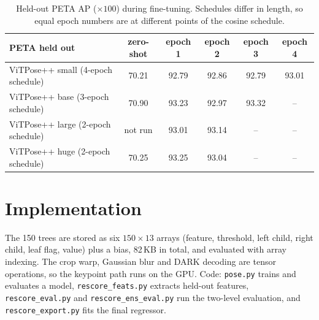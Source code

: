 \documentclass[10pt,twocolumn,letterpaper]{article}
\begin{document}
\begin{table}[h]
\centering\small
\begin{tabular}{@{}lccccc@{}}
\toprule
PETA held out & zero-shot & epoch 1 & epoch 2 & epoch 3 & epoch 4 \\
\midrule
ViTPose++ small (4-epoch schedule) & 70.21 & 92.79 & 92.86 & 92.79 & 93.01 \\
ViTPose++ base (3-epoch schedule) & 70.90 & 93.23 & 92.97 & 93.32 & -- \\
ViTPose++ large (2-epoch schedule) & not run & 93.01 & 93.14 & -- & -- \\
ViTPose++ huge (2-epoch schedule) & 70.25 & 93.25 & 93.04 & -- & -- \\
\bottomrule
\end{tabular}
\caption{Held-out PETA AP ($\times100$) during fine-tuning. Schedules differ in length, so equal epoch numbers are at different points of the cosine schedule.}
\end{table}

\section{Implementation}

The 150 trees are stored as six $150\times13$ arrays (feature, threshold, left child, right child, leaf flag, value) plus a bias, 82\,KB in total, and evaluated with array indexing. The crop warp, Gaussian blur and DARK decoding are tensor operations, so the keypoint path runs on the GPU. Code: \texttt{pose.py} trains and evaluates a model, \texttt{rescore\_feats.py} extracts held-out features, \texttt{rescore\_eval.py} and \texttt{rescore\_ens\_eval.py} run the two-level evaluation, and \texttt{rescore\_export.py} fits the final regressor.
\end{document}

